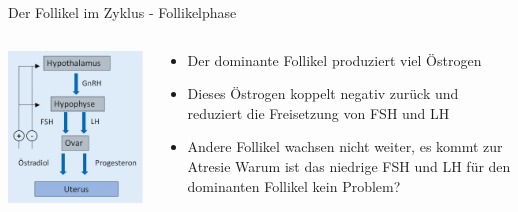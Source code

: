 \documentclass{beamer}
\begin{document}

\begin{frame}{Der Follikel im Zyklus - Follikelphase}

\begin{columns}[c]

\begin{column}{4cm}

\begin{center}
\includegraphics[width=\textwidth]{hypothalamus_hypophyse_ovar.png}
\end{center}

\end{column}

\begin{column}{7cm}
\begin{itemize}
    \item 
    Der dominante Follikel produziert viel Östrogen
    \pause
    \item
    Dieses Östrogen koppelt negativ zurück und reduziert die Freisetzung von FSH und LH
    \pause
    \item
    Andere Follikel wachsen nicht weiter, es kommt zur Atresie
    \pause
    \textcolor{theme}{Warum ist das niedrige FSH und LH für den dominanten Follikel kein Problem? }
    

\end{itemize}
\end{column}
\end{columns}
\end{frame}
\end{document}
